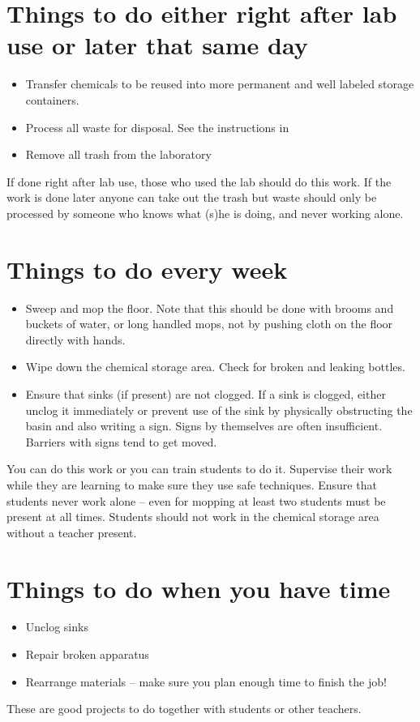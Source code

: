 \section{Things to do either right after lab use or later that same day}
\begin{itemize}
\item{Transfer chemicals to be reused into more permanent 
and well labeled storage containers.}
\item{Process all waste for disposal. 
See the instructions in }
\item{Remove all trash from the laboratory}
\end{itemize}
If done right after lab use, 
those who used the lab should do this work. 
If the work is done later 
anyone can take out the trash 
but waste should only be processed 
by someone who knows what (s)he is doing, 
and never working alone.

\section{Things to do every week}
\begin{itemize}
\item{Sweep and mop the floor. 
Note that this should be done with brooms and buckets of water, 
or long handled mops, 
not by pushing cloth on the floor directly with hands.}
\item{Wipe down the chemical storage area. 
Check for broken and leaking bottles.}
\item{Ensure that sinks (if present) are not clogged. 
If a sink is clogged, 
either unclog it immediately or prevent use of the sink 
by physically obstructing the basin and also writing a sign. 
Signs by themselves are often insufficient. 
Barriers with signs tend to get moved.}
\end{itemize}
You can do this work or you can train students to do it. 
Supervise their work while they are learning 
to make sure they use safe techniques. 
Ensure that students never work alone -- 
even for mopping at least two students must be present at all times. 
Students should not work in the chemical storage area 
without a teacher present.

\section{Things to do when you have time}
\begin{itemize}
\item{Unclog sinks}
\item{Repair broken apparatus}
\item{Rearrange materials -- 
make sure you plan enough time to finish the job!}
\end{itemize}
These are good projects to do together with students or other teachers.
